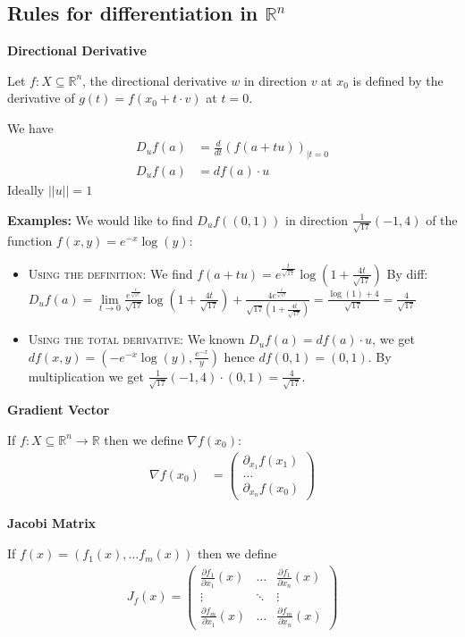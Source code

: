 \documentclass[25pt]{sciposter}
\newcommand{\R}{\mathbb{R}}
\newenvironment{method}[1]{\begin{mdframed}[backgroundcolor=blue!10,innertopmargin=15pt, innerbottommargin=15pt, nobreak=true]
		\textbf{#1 }
	}
	{ 
	\end{mdframed}
}
\begin{document}
\begin{multicols}{3}
\subsection*{Rules for differentiation in $\R^n$}

\begin{method}{Directional Derivative}
	Let $f:X\subseteq \R^n$, the directional derivative $w$ in direction $v$ at $x_0$ is defined by the derivative of $g(t) = f(x_0+t\cdot v)$ at $t = 0$. 
	
	We have \begin{align*}
		D_u f(a) &= \frac{d}{dt} (f(a+tu))_{|t=0}\\
		D_u f(a) &= df(a) \cdot u
	\end{align*}
	Ideally $||u|| = 1$
\end{method}
\textbf{Examples:}
We would like to find $D_u f((0,1))$ in direction $\frac{1}{\sqrt{17}}(-1,4)$ of the function $f(x,y) = e^{-x} \log(y)$:
\begin{itemize}
	\item \textsc{Using the definition:} We find $f(a+tu) = e^{\frac{t}{\sqrt{17}}} \log\left(1 + \frac{4t}{\sqrt{17}}\right)$ By diff: $D_u f(a) = \lim\limits_{t \to 0} \frac{e^{\frac{t}{\sqrt{17}}}}{\sqrt{17}} \log\left(1 + \frac{4t}{\sqrt{17}}\right) + \frac{4e^{\frac{t}{\sqrt{17}}}}{\sqrt{17}(1 + \frac{4t}{\sqrt{17}})} = \frac{\log(1) + 4}{\sqrt{17}} = \frac{4}{\sqrt{17}}$
	
	
	\item \textsc{Using the total derivative:} We known $D_u f(a) = df(a) \cdot u$, we get $df(x,y) = (-e^{-x}\log(y), \frac{e^{-x}}{y})$ hence $df(0,1) = (0,1)$. By multiplication we get $\frac{1}{\sqrt{17}}(-1,4) \cdot (0,1) = \frac{4}{\sqrt{17}}$.
\end{itemize}



\begin{method}{Gradient Vector}
	If $f:X\subseteq \R^n \to \R$ then we define $\nabla f(x_0)$:
	\begin{align*}
		\nabla f(x_0) &= 	\begin{pmatrix}
		\partial_{x_1} f(x_1)\\
		\ldots\\
		\partial_{x_n} f(x_0)
		\end{pmatrix}
	\end{align*}
\end{method}

\begin{method}{Jacobi Matrix}
	If $f(x) = (f_1(x),\ldots f_m(x))$ then we define
	\begin{align*}
		J_f(x) = \begin{pmatrix}
		\frac{\partial f_1}{\partial x_1}(x) & \ldots & \frac{\partial f_1}{\partial x_n}(x) \\
		\vdots & \ddots & \vdots \\
		\frac{\partial f_m}{\partial x_1}(x) & \ldots & \frac{\partial f_m}{\partial x_n}(x)	
		\end{pmatrix}
	\end{align*}
\end{method}


\end{multicols}
\end{document}
